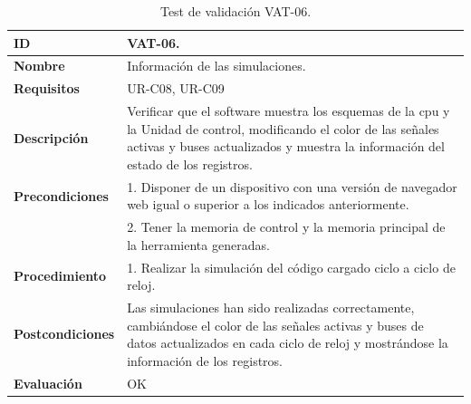 \begin{center}
\begin{table}[htb]
\centering
\caption{Test de validación VAT-06.}
\label{tab:vat-06}
\begin{tabular}{@{}p{2.5cm} p{9cm}@{}} 
\toprule
\textbf{ID} 					& VAT-06. \\
\midrule
\textbf{Nombre} 				& Información de las simulaciones. \\
\midrule
\textbf{Requisitos} 		& UR-C08, UR-C09\\
\midrule
\textbf{Descripción} 		& Verificar que el \gls{software} muestra los esquemas de la \acrshort{cpu} y la Unidad de control, modificando el color de las señales activas y buses actualizados y muestra la información del estado de los registros. \\
\midrule
\textbf{Precondiciones}		& 1. Disponer de un dispositivo con una versión de navegador web igual o superior a los indicados anteriormente. \\
											& 2. Tener la memoria de control y la memoria principal de la herramienta generadas. \\
\midrule
\textbf{Procedimiento}		& 1. Realizar la simulación del código cargado ciclo a ciclo de reloj.\\
\midrule
\textbf{Postcondiciones} 		&  Las simulaciones han sido realizadas correctamente, cambiándose el color de las señales activas y buses de datos actualizados en cada ciclo de reloj y mostrándose la información de los registros.\\
\midrule
\textbf{Evaluación} 			& OK \\
\bottomrule
\end{tabular}
\end{table}
\end{center}

